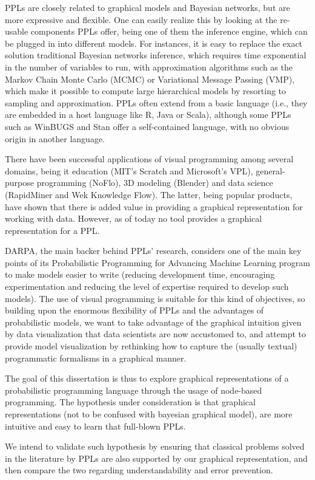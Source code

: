 PPLs are closely related to graphical models and Bayesian networks, but are
more expressive and flexible. One can easily realize this by looking at the
re-usable components PPLs offer, being one of them the inference engine, which
can be plugged in into different models. For instances, it is easy to replace
the exact solution traditional Bayesian networks inference, which requires time
exponential in the number of variables to run, with approximation algorithms
such as the Markov Chain Monte Carlo (MCMC) or Variational Message Passing
(VMP), which make it possible to compute large hierarchical models by resorting
to sampling and approximation. PPLs often extend from a basic language (i.e.,
they are embedded in a host language like R, Java or Scala), although some PPLs
such as WinBUGS and Stan offer a self-contained language, with no obvious origin
in another language.

There have been successful applications of visual programming among several
domains, being it education (MIT’s Scratch and Microsoft’s VPL), general-purpose
programming (NoFlo), 3D modeling (Blender) and data science (RapidMiner and Wek
 Knowledge Flow). The latter, being popular products, have shown that there is
 added value in providing a graphical representation for working with data.
 However, as of today no tool provides a graphical representation for a PPL.

DARPA, the main backer behind PPLs’ research, considers one of the main key
points of its Probabilistic Programming for Advancing Machine Learning program
to make models easier to write (reducing development time, encouraging
experimentation and reducing the level of expertise required to develop such
models). The use of visual programming is suitable for this kind of objectives,
so building upon the enormous flexibility of PPLs and the advantages of
probabilistic models, we want to take advantage of the graphical intuition given
by data visualization that data scientists are now accustomed to, and attempt
to provide model visualization by rethinking how to capture
the (usually textual) programmatic formalisms in a graphical manner.

The goal of this dissertation is thus to explore graphical representations of a
probabilistic programming language through the usage of node-based programming.
The hypothesis under consideration is that graphical representations (not to be
confused with bayesian graphical model), are more intuitive and easy to learn
that full-blown PPLs.

We intend to validate such hypothesis by ensuring that classical problems solved
in the literature by PPLs are also supported by our graphical representation,
and then compare the two regarding understandability and error prevention.

